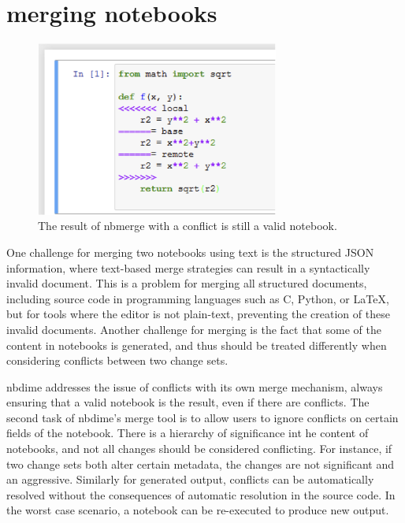 \documentclass{deliverablereport}
\begin{document}

\section{merging notebooks} %
\label{sec:merging_notebooks}

\begin{figure}
    \center
    \includegraphics[width=8cm]{img/nbmerge}
    \caption{The result of nbmerge with a conflict is still a valid notebook.}
    \label{fig:nbmerge}
\end{figure}

One challenge for merging two notebooks using text is the structured JSON information, where
text-based merge strategies can result in a syntactically invalid document. This is a problem for
merging all structured documents, including source code in programming languages such as C, Python,
or \LaTeX, but for tools where the editor is not plain-text, preventing the creation of these
invalid documents. Another challenge for merging is the fact that some of the content in notebooks
is generated, and thus should be treated differently when considering conflicts between two change
sets.

nbdime addresses the issue of conflicts with its own merge mechanism, always ensuring that a valid notebook is the result, even if there are conflicts.
The second task of nbdime's merge tool is to allow users to ignore conflicts on certain fields of the notebook.
There is a hierarchy of significance int he content of notebooks,
and not all changes should be considered conflicting.
For instance, if two change sets both alter certain metadata,
the changes are not significant and an aggressive.
Similarly for generated output, conflicts can be automatically resolved without the consequences of automatic resolution in the source code.
In the worst case scenario, a notebook can be re-executed to produce new output.
\end{document}

